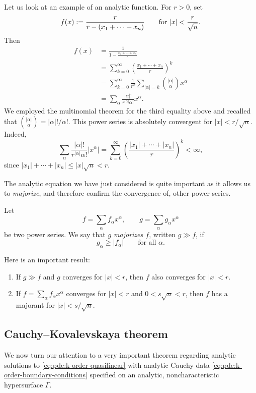 \begin{example}
  Let us look at an example of an analytic function. For \(r>0\), set
  \[
    f(x)\defeq \frac{r}{r-(x_1+\dotsm+x_n)}
    \qquad
    \text{for \(|x|<\frac{r}{\sqrt{n}}\).}
  \]
  Then
  \begin{align*}
    f(x)
    &=\frac{1}{\displaystyle 1-\frac{x_1+\dotsb+x_n}{r}}\\
    &=\sum_{k=0}^\infty\left(\frac{x_1+\dotsb+x_n}{r}\right)^k\\
    &=\sum_{k=0}^\infty\frac{1}{r^k}\sum_{|\alpha|=k}\binom{|\alpha|}{\alpha}x^\alpha\\
    &=\sum_\alpha\frac{|\alpha|!}{r^{|\alpha|}\alpha!}x^\alpha.
  \end{align*}
  We employed the multinomial theorem for the third equality above and
  recalled that \(\binom{|\alpha|}{\alpha}=|\alpha|!/\alpha!\). This power
  series is absolutely convergent for \(|x|<r/\sqrt{n}\). Indeed,
  \[
    \sum_\alpha\frac{|\alpha|!}{r^{|\alpha|}{\alpha!}}|x^\alpha|
    =\sum_{k=0}^\infty\left(\frac{|x_1|+\dotsb+|x_n|}{r}\right)^k<\infty,
  \]
  since \(|x_1|+\dotsb+|x_n|\leq |x|\sqrt{n}<r\).
\end{example}

The analytic equation we have just considered is quite important as it
allows us to \emph{majorize}, and therefore confirm the convergence of,
other power series.

\begin{definition}
  Let
  \[
    f=\sum_\alpha f_\alpha x^\alpha,\qquad g=\sum_\alpha g_\alpha x^\alpha
  \]
  be two power series. We say that \emph{\(g\) majorizes \(f\)}, written
  \(g\gg f\), if
  \[
    g_\alpha\geq |f_\alpha|\qquad\text{for all \(\alpha\).}
  \]
\end{definition}

Here is an important result:
\begin{lemma}[Majorants]
  \hfill
  \begin{enumerate}[label=(\roman*),noitemsep]
  \item If \(g\gg f\) and \(g\) converges for \(|x|<r\), then \(f\) also
    converges for \(|x|<r\).
  \item If \(f=\sum_\alpha f_\alpha x^\alpha\) converges for \(|x|<r\) and
    \(0<s\sqrt{n}<r\), then \(f\) has a majorant for \(|x|<s/\sqrt{n}\).
  \end{enumerate}
\end{lemma}

\subsection{Cauchy--Kovalevskaya theorem}
We now turn our attention to a very important theorem regarding analytic
solutions to \eqref{eq:pde:k-order-quasilinear} with analytic Cauchy data
\eqref{eq:pde:k-order-boundary-conditions} specified on an analytic,
noncharacteristic hypersurface \(\Gamma\).

